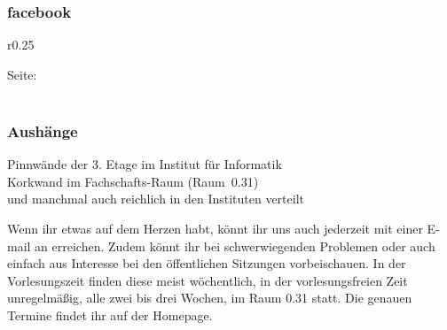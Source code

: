 \subsubsection{facebook}
\begin{wrapfigure}{r}{0.25\textwidth}\centering
\end{wrapfigure}
    Seite:  \\
     \\
\subsubsection{Aushänge}
    Pinnwände der 3. Etage im Institut für Informatik \\
    Korkwand im Fachschafts-Raum (Raum~0.31) \\
    und manchmal auch reichlich in den Instituten verteilt

Wenn ihr etwas auf dem Herzen habt, könnt ihr uns auch jederzeit mit einer E-mail an  erreichen.
Zudem könnt ihr bei schwerwiegenden Problemen oder auch einfach aus Interesse bei den öffentlichen Sitzungen vorbeischauen.
In der Vorlesungszeit finden diese meist wöchentlich, in der vorlesungsfreien Zeit unregelmäßig, alle zwei bis drei Wochen, im Raum 0.31 statt.
Die genauen Termine findet ihr auf der Homepage.



